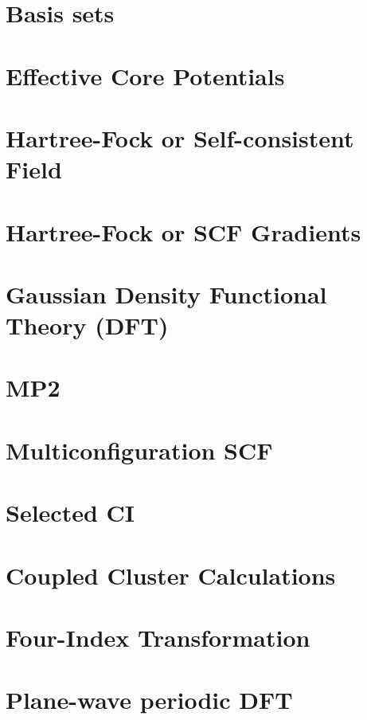 \chapter{Basis sets}


\chapter{Effective Core Potentials}


\chapter{Hartree-Fock or Self-consistent Field} 


\chapter{Hartree-Fock or SCF Gradients}


\chapter{Gaussian Density Functional Theory (DFT)}


\chapter{MP2}


\chapter{Multiconfiguration SCF}


\chapter{Selected CI}


\chapter{Coupled Cluster Calculations}


\chapter{Four-Index Transformation}


\chapter{Plane-wave periodic DFT}


